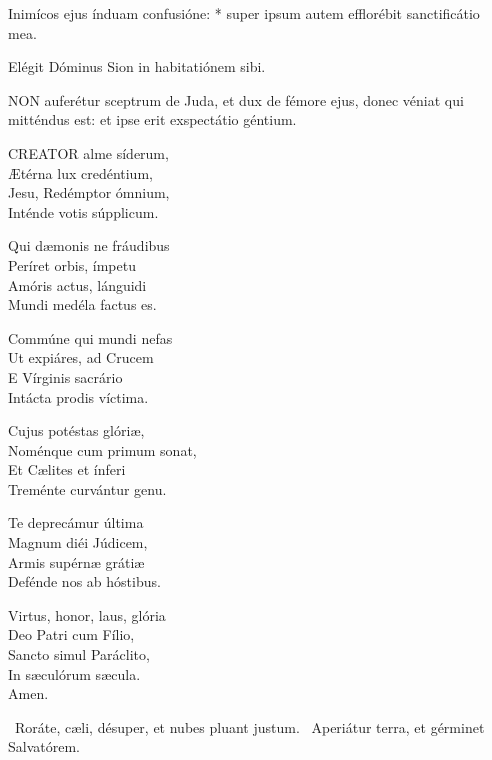 Inimícos ejus índuam confusióne: * super ipsum autem efflorébit sanctificátio mea.

 Elégit Dóminus Sion in habitatiónem sibi.



\lettrine[lines=2]{N}{ON} auferétur sceptrum de Juda, et dux de fémore ejus, donec véniat qui mitténdus est: et ipse erit exspectátio géntium.


\lettrine[lines=2]{C}{REATOR} alme síderum,\\
Ætérna lux credéntium,\\
Jesu, Redémptor ómnium,\\
Inténde votis súpplicum.

Qui dæmonis ne fráudibus\\
Períret orbis, ímpetu\\
Amóris actus, lánguidi\\
Mundi medéla factus es.

Commúne qui mundi nefas\\
Ut expiáres, ad Crucem\\
E Vírginis sacrário\\
Intácta prodis víctima.

Cujus potéstas glóriæ,\\
Noménque cum primum sonat,\\
Et Cælites et ínferi\\
Treménte curvántur genu.

Te deprecámur última\\
Magnum diéi Júdicem,\\
Armis supérnæ grátiæ\\
Defénde nos ab hóstibus.

Virtus, honor, laus, glória\\
Deo Patri cum Fílio,\\
Sancto simul Paráclito,\\
In sæculórum sæcula.\\
Amen.

\V\ Roráte, cæli, désuper, et nubes pluant justum. \R\ Aperiátur terra, et gérminet Salvatórem.



